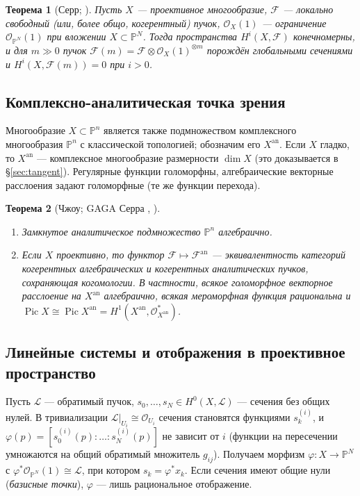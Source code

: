 \documentclass[11pt,a4paper]{article}
\theoremstyle{plain}
\newtheorem{theorem}{Теорема}[section]
\theoremstyle{definition}
\theoremstyle{remark}
\newcommand{\PP}{\mathbb{P}}
\newcommand{\cO}{\mathcal{O}}
\newcommand{\cL}{\mathcal{L}}
\newcommand{\cF}{\mathcal{F}}
\DeclareMathOperator{\Pic}{Pic}
\newcommand{\an}{\mathrm{an}}
\begin{document}
\begin{theorem}[{Серр; \cite[III.5.2]{Ha}}]\label{thm:Serre}
Пусть $X$ --- проективное многообразие, $\cF$ --- локально свободный (или, более общо, когерентный)
пучок, $\cO_X(1)$ --- ограничение $\cO_{\PP^N}(1)$ при вложении $X\subset \PP^N$. Тогда
пространства $H^i(X,\cF)$ конечномерны, и для $m\gg0$ пучок $\cF(m)=\cF\otimes\cO_X(1)^{\otimes m}$
порождён глобальными сечениями и $H^i(X,\cF(m))=0$ при $i>0$.
\end{theorem}

\subsection{Комплексно-аналитическая точка зрения}\label{ss:analytic}

Многообразие $X\subset\PP^n$ является также подмножеством комплексного многообразия $\PP^n$ с
классической топологией; обозначим его $X^{\an}$. Если $X$ гладко, то $X^{\an}$ --- комплексное
многообразие размерности $\dim X$ (это доказывается в \S\ref{sec:tangent}). Регулярные функции
голоморфны, алгебраические векторные расслоения задают голоморфные (те же функции перехода).

\begin{theorem}[{Чжоу; GAGA Серра \cite{Se}, \cite[гл.~1, \S\,3]{GH}}]\label{thm:GAGA}
\begin{enumerate}
\item Замкнутое аналитическое подмножество $\PP^n$ алгебраично.
\item Если $X$ проективно, то функтор $\cF\mapsto\cF^{\an}$ --- эквивалентность категорий
когерентных алгебраических и когерентных аналитических пучков, сохраняющая когомологии. В
частности, всякое голоморфное векторное расслоение на $X^{\an}$ алгебраично, всякая
мероморфная функция рациональна и $\Pic X\cong\Pic X^{\an}=H^1(X^{\an},\cO^*_{X^{\an}})$.
\end{enumerate}
\end{theorem}

\subsection{Линейные системы и отображения в проективное пространство}\label{ss:linsys}

Пусть $\cL$ --- обратимый пучок, $s_0,\dots,s_N\in H^0(X,\cL)$ --- сечения без общих нулей. В
тривиализации $\cL|_{U_i}\cong\cO_{U_i}$ сечения становятся функциями $s_k^{(i)}$, и
$\varphi(p)=[s_0^{(i)}(p):\dots:s_N^{(i)}(p)]$ не зависит от $i$ (функции на пересечении
умножаются на общий обратимый множитель $g_{ij}$). Получаем морфизм
$\varphi\colon X\to\PP^N$ с $\varphi^*\cO_{\PP^N}(1)\cong\cL$, при котором $s_k=\varphi^*x_k$.
Если сечения имеют общие нули (\emph{базисные точки}), $\varphi$ --- лишь рациональное
отображение.
\end{document}
